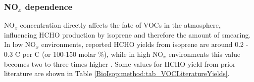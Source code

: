       
      
    
      
      
    \subsubsection{NO$_x$ dependence}
    
      NO$_x$ concentration directly affects the fate of VOCs in the atmosphere, influencing HCHO production by isoprene and therefore the amount of smearing.
      In low NO$_x$ environments, reported HCHO yields from isoprene are around 0.2 - 0.3 C per C (or 100-150 molar \%), while in high NO$_x$ environments this value becomes two to three times higher \parencite{Palmer2003, Wolfe2016}.
      Some values for HCHO yield from prior literature are shown in Table \ref{BioIsop:method:tab_VOCLiteratureYields}.
      
      
